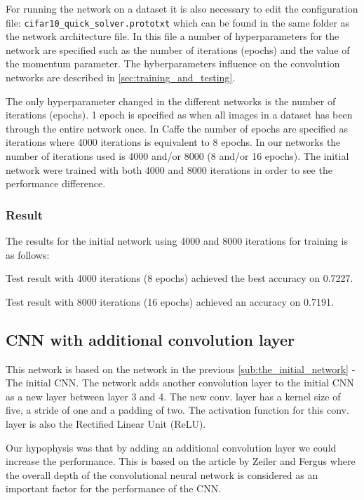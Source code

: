 For running the network on a dataset it is also necessary to edit the
configuration file: \verb|cifar10_quick_solver.prototxt| which can be found in
the same folder as the network architecture file. In this file a number of
hyperparameters for the network are specified such as the number of iterations
(epochs) and the value of the momentum parameter. The hyberparameters influence
on the convolution networks are described in \autoref{sec:training_and_testing}.


The only hyperparameter changed in the different networks is the number of
iterations (epochs). 1 epoch is specified as when all images in a dataset has
been through the entire network once. In Caffe the number of epochs are
specified as iterations where 4000 iterations is equivalent to 8 epochs. In
our networks the number of iterations used is 4000 and/or 8000 (8 and/or 16
epochs). The initial network were trained with both 4000 and 8000 iterations in
order to see the performance difference.  


\subsubsection{Result}

The results for the initial network using 4000 and 8000 iterations for training
is as follows: 

Test result with 4000 iterations (8 epochs) achieved the best accuracy on 0.7227.   

Test result with 8000 iterations (16 epochs) achieved an accuracy on 0.7191. 



\subsection{CNN with additional convolution layer} %
\label{sub:cnn}

This network is based on the network in the previous
\autoref{sub:the_initial_network} - The initial CNN. The network adds another
convolution layer to the initial CNN as a new layer between layer 3 and 4. The
new conv. layer has a kernel size of five, a stride of one and a padding of two.
The activation function for this conv. layer is also the Rectified Linear Unit
(ReLU). 

Our hypophysis was that by adding an additional convolution layer we could
increase the performance. This is based on the article by Zeiler and
Fergus\cite{ZeilerFergus} where the overall depth of the convolutional neural
network is considered as an important factor for the performance of the CNN. 


